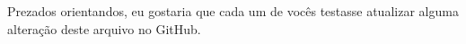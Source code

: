 \documentclass{article}
\begin{document}
Prezados orientandos,
eu gostaria que cada um de vocês testasse atualizar alguma alteração deste arquivo no GitHub.
\end{document}
